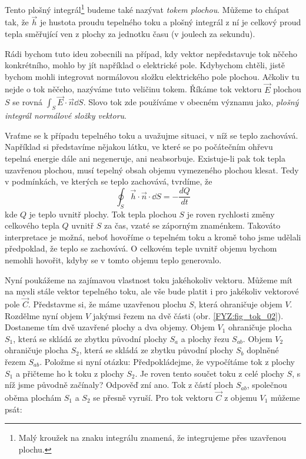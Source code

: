     Tento plošný integrál\footnote{Malý kroužek na znaku integrálu znamená, že integrujeme přes 
    uzavřenou plochu.} budeme také nazývat \emph{tokem plochou}. Můžeme to chápat tak, že $\vec{h}$ 
    je hustota proudu tepelného toku a plošný integrál z ní je celkový proud tepla směřující ven z 
    plochy za jednotku času (v joulech za sekundu).
    
    Rádi bychom tuto ideu zobecnili na případ, kdy vektor nepředstavuje tok něčeho konkrétního, 
    mohlo by jít například o elektrické pole. Kdybychom chtěli, jistě bychom mohli integrovat 
    normálovou složku elektrického pole plochou. Ačkoliv tu nejde o tok něčeho, nazýváme tuto 
    veličinu tokem. Říkáme tok vektoru $\vec{E}$ plochou \(S\) se rovná 
    \(\int_S\vec{E}\cdot\vec{n}\dd{S}\). Slovo tok zde používáme v obecném významu jako, 
    \emph{plošný integrál normálové složky vektoru}.      
    
    Vraťme se k případu tepelného toku a uvažujme situaci, v níž se teplo zachovává. Například si
    představíme nějakou látku, ve které se po počátečním ohřevu tepelná energie dále ani negeneruje, 
    ani neabsorbuje. Existuje-li pak tok tepla uzavřenou plochou, musí tepelný obsah objemu 
    vymezeného plochou klesat. Tedy v podmínkách, ve kterých se teplo zachovává, tvrdíme, že
    \begin{equation}\label{FYZ:eq_int_fey_dQ}
      \oint_S\vec{h}\cdot\vec{n}\cdot\dd{S} = - \frac{dQ}{dt}
    \end{equation}
    kde $Q$ je teplo uvnitř plochy. Tok tepla plochou $S$ je roven rychlosti změny celkového tepla 
    $Q$ uvnitř $S$ za čas, vzaté se záporným znaménkem. Takováto interpretace je možná, neboť 
    hovoříme o tepelném toku a kromě toho jsme udělali předpoklad, že teplo se zachovává. O celkovém 
    teple uvnitř objemu bychom nemohli hovořit, kdyby se v tomto objemu teplo generovalo.
    
    Nyní poukážeme na zajímavou vlastnost toku jakéhokoliv vektoru. Můžeme mít na mysli stále vektor 
    tepelného toku, ale vše bude platit i pro jakékoliv vektorové pole $\vec{C}$. Představme si, že 
    máme uzavřenou plochu $S$, která ohraničuje objem $V$. Rozdělme nyní objem $V$ jakýmsi řezem na 
    dvě části (obr. \ref{FYZ:fig_tok_02}). Dostaneme tím dvě uzavřené plochy a dva objemy. Objem 
    $V_1$ ohraničuje plocha $S_1$, která se skládá ze zbytku původní plochy $S_a$ a plochy řezu 
    $S_{ab}$. Objem $V_2$ ohraničuje plocha $S_2$, která se skládá ze zbytku původní plochy $S_b$ 
    doplněné řezem $S_{ab}$. Položme si nyní otázku: Předpokládejme, že vypočítáme tok z plochy 
    $S_1$ a přičteme ho k toku z plochy $S_2$. Je roven tento součet toku z celé plochy $S$, s níž 
    jsme původně začínaly? Odpověď zní ano. Tok z částí ploch $S_{ab}$, společnou oběma plochám 
    $S_1$ a $S_2$ se přesně vyruší. Pro tok vektoru $\vec{C}$ z objemu $V_1$ můžeme psát:
    
